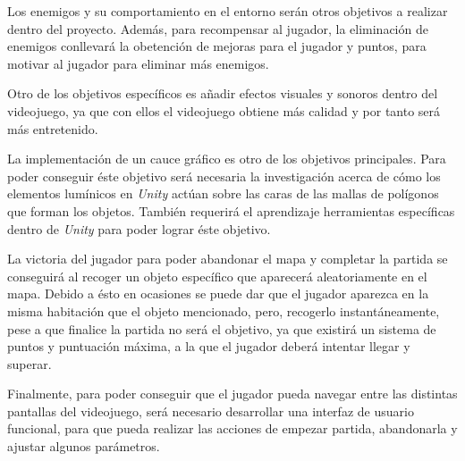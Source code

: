 Los enemigos y su comportamiento en el entorno serán otros objetivos a realizar dentro del proyecto. Además, para recompensar al jugador, la eliminación de enemigos conllevará la obetención de mejoras para el jugador y puntos, para motivar al jugador para eliminar más enemigos. 

Otro de los objetivos específicos es añadir efectos visuales y sonoros dentro del videojuego, ya que con ellos el videojuego obtiene más calidad y por tanto será más entretenido.

La implementación de un cauce gráfico es otro de los objetivos principales. Para poder conseguir éste objetivo será necesaria la investigación acerca de cómo los elementos lumínicos en \textit{Unity} actúan sobre las caras de las mallas de polígonos que forman los objetos. También requerirá el aprendizaje herramientas específicas dentro de \textit{Unity} para poder lograr éste objetivo.

La victoria del jugador para poder abandonar el mapa y completar la partida se conseguirá al recoger un objeto específico que aparecerá aleatoriamente en el mapa. Debido a ésto en ocasiones se puede dar que el jugador aparezca en la misma habitación que el objeto mencionado, pero, recogerlo instantáneamente, pese a que finalice la partida no será el objetivo, ya que existirá un sistema de puntos y puntuación máxima, a la que el jugador deberá intentar llegar y superar.

Finalmente, para poder conseguir que el jugador pueda navegar entre las distintas pantallas del videojuego, será necesario desarrollar una interfaz de usuario funcional, para que pueda realizar las acciones de empezar partida, abandonarla y ajustar algunos parámetros.
